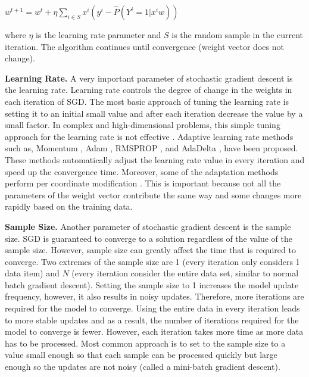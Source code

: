 \begin{center}
${w}^{t+1} = {w}^t + \eta \sum_{i \in S} x^i (y^i - \hat{P}(Y^i = 1 | x^i w))$
\end{center}

where $\eta$ is the learning rate parameter and $S$ is the random sample in the current iteration.
The algorithm continues until convergence (weight vector does not change).

\textbf{Learning Rate.}
A very important parameter of stochastic gradient descent is the learning rate.
Learning rate controls the degree of change in the weights in each iteration of SGD.
The most basic approach of tuning the learning rate is setting it to an initial small value and after each iteration decrease the value by a small factor.
In complex and high-dimensional problems, this simple tuning approach for the learning rate is not effective \cite{schaul2013no}. 
Adaptive learning rate methods such as, Momentum \cite{qian1999momentum}, Adam \cite{kingma2014adam}, RMSPROP \cite{tieleman2012lecture}, and AdaDelta \cite{zeiler2012adaptive}, have been proposed.
These methods automatically adjust the learning rate value in every iteration and speed up the convergence time.
Moreover, some of the adaptation methods perform per coordinate modification \cite{schaul2013no, tieleman2012lecture, zeiler2012adaptive}. 
This is important because not all the parameters of the weight vector contribute the same way and some changes more rapidly based on the training data.

\textbf{Sample Size.}
Another parameter of stochastic gradient descent is the sample size.
SGD is guaranteed to converge to a solution regardless of the value of the sample size.
However, sample size can greatly affect the time that is required to converge.
Two extremes of the sample size are 1 (every iteration only considers 1 data item) and $N$ (every iteration consider the entire data set, similar to normal batch gradient descent).
Setting the sample size to 1 increases the model update frequency, however, it also results in noisy updates.
Therefore, more iterations are required for the model to converge.
Using the entire data in every iteration leads to more stable updates and as a result, the number of iterations required for the model to converge is fewer.
However, each iteration takes more time as more data has to be processed.
Most common approach is to set to the sample size to a value small enough so that each sample can be processed quickly but large enough so the updates are not noisy (called a mini-batch gradient descent).

